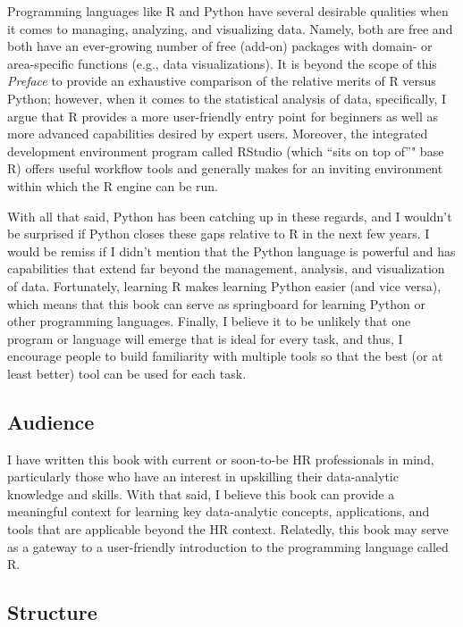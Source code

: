 \documentclass[]{book}
\begin{document}
Programming languages like R and Python have several desirable qualities
when it comes to managing, analyzing, and visualizing data. Namely, both
are free and both have an ever-growing number of free (add-on) packages
with domain- or area-specific functions (e.g., data visualizations). It
is beyond the scope of this \emph{Preface} to provide an exhaustive
comparison of the relative merits of R versus Python; however, when it
comes to the statistical analysis of data, specifically, I argue that R
provides a more user-friendly entry point for beginners as well as more
advanced capabilities desired by expert users. Moreover, the integrated
development environment program called RStudio (which ``sits on top
of''" base R) offers useful workflow tools and generally makes for an
inviting environment within which the R engine can be run.

With all that said, Python has been catching up in these regards, and I
wouldn't be surprised if Python closes these gaps relative to R in the
next few years. I would be remiss if I didn't mention that the Python
language is powerful and has capabilities that extend far beyond the
management, analysis, and visualization of data. Fortunately, learning R
makes learning Python easier (and vice versa), which means that this
book can serve as springboard for learning Python or other programming
languages. Finally, I believe it to be unlikely that one program or
language will emerge that is ideal for every task, and thus, I encourage
people to build familiarity with multiple tools so that the best (or at
least better) tool can be used for each task.

\subsection{Audience}\label{audiencepref}

I have written this book with current or soon-to-be HR professionals in
mind, particularly those who have an interest in upskilling their
data-analytic knowledge and skills. With that said, I believe this book
can provide a meaningful context for learning key data-analytic
concepts, applications, and tools that are applicable beyond the HR
context. Relatedly, this book may serve as a gateway to a user-friendly
introduction to the programming language called R.

\subsection{Structure}\label{structurepref}
\end{document}
